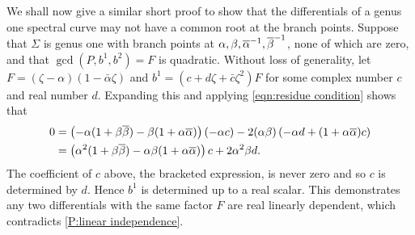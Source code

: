 \documentclass{article}
\begin{document}
We shall now give a similar short proof to show that the differentials of a genus one spectral curve may not have a common root at the branch points. Suppose that $\Sigma$ is genus one with branch points at $\alpha,\beta,\overline{\alpha}^{-1},\overline{\beta}^{-1}$, none of which are zero, and that $\gcd(P,b^1,b^2) = F$ is quadratic. Without loss of generality, let $F = (\zeta-\alpha)(1-\bar{\alpha}\zeta)$ and $b^1 = (c + d\zeta + \bar{c}\zeta^2)F$ for some complex number $c$ and real number $d$. Expanding this and applying \eqref{eqn:residue condition} shows that
\begin{align*}
0 &= \left( -\alpha(1+\beta\overline{\beta}) - \beta(1+\alpha\overline{\alpha}) \right)(-\alpha c) - 2(\alpha\beta)\left(-\alpha d + (1+\alpha\overline{\alpha})c\right)\\
&= \left( \alpha^2(1+\beta\overline{\beta}) - \alpha\beta(1+\alpha\overline{\alpha}) \right)c + 2\alpha^2\beta d.
\end{align*}
The coefficient of $c$ above, the bracketed expression, is never zero and so $c$ is determined by $d$. Hence $b^1$ is determined up to a real scalar. This demonstrates any two differentials with the same factor $F$ are real linearly dependent, which contradicts \ref{P:linear independence}.
\end{document}
